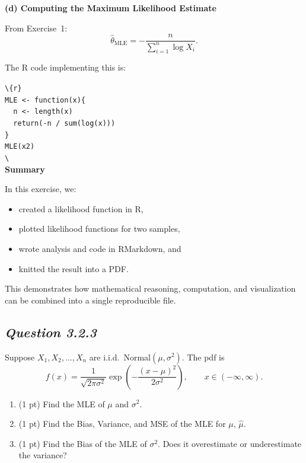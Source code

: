 \documentclass[11pt,letterpaper]{article}
\theoremstyle{remark}
\begin{document}
\medskip
\noindent\textbf{(d) Computing the Maximum Likelihood Estimate}

From Exercise~1:
\[
\hat{\theta}_{\mathrm{MLE}} = -\frac{n}{\sum_{i=1}^n \log X_i}.
\]

The R code implementing this is:

\texttt{\textbackslash{}\textbacktick{}\textbacktick{}\textbacktick\{r\}} \\
\texttt{MLE <- function(x)\{} \\
\texttt{\ \ n <- length(x)} \\
\texttt{\ \ return(-n / sum(log(x)))} \\
\texttt{\}} \\[4pt]
\texttt{MLE(x2)} \\
\texttt{\textbackslash{}\textbacktick{}\textbacktick{}\textbacktick} \\

\medskip
\noindent\textbf{Summary}

In this exercise, we:
\begin{itemize}
    \item created a likelihood function in R,
    \item plotted likelihood functions for two samples,
    \item wrote analysis and code in RMarkdown, and
    \item knitted the result into a PDF.
\end{itemize}
This demonstrates how mathematical reasoning, computation, and visualization can be combined into a single reproducible file.

\newpage

\subsection*{\textit{\textbf{Question 3.2.3}}}

Suppose $X_1, X_2, \ldots, X_n$ are i.i.d.\ Normal$(\mu, \sigma^2)$. The pdf is
\[
f(x) = \frac{1}{\sqrt{2\pi\sigma^2}} \exp\!\left( -\frac{(x-\mu)^2}{2\sigma^2} \right),
\qquad x \in (-\infty,\infty).
\]

\begin{enumerate}
    \item[(a)] (1 pt) Find the MLE of $\mu$ and $\sigma^2$.
    \item[(b)] (1 pt) Find the Bias, Variance, and MSE of the MLE for $\mu$, $\hat{\mu}$.
    \item[(c)] (1 pt) Find the Bias of the MLE of $\sigma^2$. Does it overestimate or underestimate the variance?
\end{enumerate}
\end{document}
